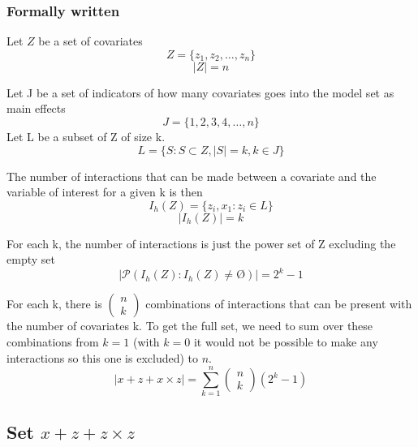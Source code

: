 \subsubsection{Formally written}
Let $Z$ be a set of covariates 
\[Z=\{\left.z_1,z_2,\dots ,z_n\right.\}\] 
\[|Z|=n\] 

Let J be a set of indicators of how many covariates goes into the model set as main effects
\[J=\{\left.1,2,3,4,\dots ,n\right.\}\] 
Let L be a subset of Z of size k.
\[L=\{\left.S:S\subset Z,\left|S\right|=k,k\in J\right.\}\] 

The number of interactions that can be made between a covariate and the variable of interest for a given k is then
\[I_h\left(Z\right)=\{\left.\left.z_i,x_1\right.:z_i\in L\right.\}\] 
\[\left|I_h\left(Z\right)\right|=k\] 

For each k, the number of interactions is just the power set of Z excluding the empty set
\[\left|\mathcal{P}\left(I_h\left(Z\right):I_h\left(Z\right)\neq \textrm{\O}\right)\right|=2^k-1\] 

For each k, there is $\left( \begin{array}{c}
n \\ 
k \end{array}
\right)$ combinations of interactions that can be present with the number of covariates k. To get the full set, we need to sum over these combinations from $k=1$ (with $k=0$ it would not be possible to make any interactions so this one is excluded) to $n$.
\[\left|x + z + x \times z\right|=\sum^n_{k=1}{\left( \begin{array}{c}
n \\ 
k \end{array}
\right)\left(2^k-1\right)}\] 
\textbf{}

\subsection{Set $x + z + z \times z$}

